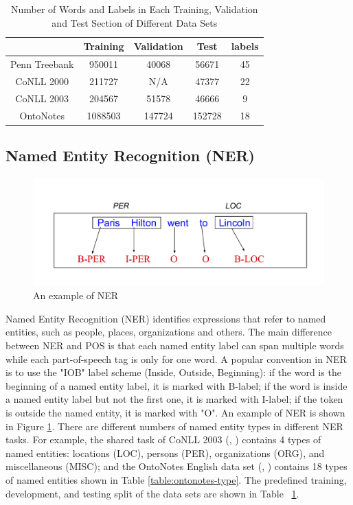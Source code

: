 \begin{table}[]
\centering
\caption{Number of Words and Labels in Each Training, Validation and Test Section of Different Data Sets}
\label{table:my-dataset}
\begin{tabular}{|c|c|c|c|c|} \hline
      & Training  & Validation  & Test  & labels  \\ \hline
Penn Treebank   &950011 &40068 &56671 &45 \\\hline
CoNLL 2000   &211727 & N/A   &47377 &22   \\\hline
CoNLL 2003   &204567 &51578 &46666 &9     \\\hline
OntoNotes   &1088503 &147724 &152728 &18     \\\hline
\end{tabular}
\end{table}

\subsection{Named Entity Recognition (NER)}

\begin{figure}
  \centering
  \includegraphics[scale=0.6]{nerex.pdf}
 \caption{An example of NER}
  \label{fig:ner-ex}
\end{figure}

Named Entity Recognition (NER) identifies expressions
that refer to named entities, such as people, places, organizations and others. The main difference between NER and POS is that each named entity label can span multiple words while each part-of-speech tag is only for one word. A popular convention in NER is to use the "IOB" label scheme (Inside, Outside, Beginning): if the word is the beginning of a named entity label, it is marked with B-label; if the word is inside a named entity label but not the first one, it is marked with I-label; if the token is outside the named entity, it is marked with "O". An example of NER is shown in Figure \ref{fig:ner-ex}. There are different numbers of named entity types in different NER tasks. For example, the shared task of CoNLL 2003 (\citeauthor{tjong2003introduction}, \citeyear{tjong2003introduction}) contains 4 types of named entities: locations (LOC), persons (PER), organizations (ORG), and miscellaneous (MISC); and the OntoNotes English data set (\citeauthor{hovy2006ontonotes}, \citeyear{hovy2006ontonotes}) contains 18 types of named entities shown in Table \ref{table:ontonotes-type}. The predefined training, development, and testing split of the data sets are shown in Table ~\ref{table:my-dataset}.

